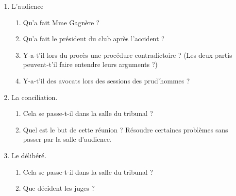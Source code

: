 \documentclass[12pt]{article}
\begin{document}
\begin{enumerate}
\item L'audience
\begin{enumerate}
\item  Qu'a fait Mme Gagnère ? \\

\item Qu'a fait le président du club après l'accident ? \\

\item  Y-a-t'il lors du procès une procédure contradictoire ? (Les deux partis peuvent-t'il faire entendre leurs arguments ?)\\

\item  Y-a-t'il des avocats lors des sessions des prud'hommes ?\\
\end{enumerate}

\item La conciliation. 
\begin{enumerate}
\item Cela se passe-t-il dans la salle du tribunal ? \\

\item Quel est le but de cette réunion ? Résoudre certaines problèmes sans passer par la salle d'audience. \\
 
\end{enumerate}

\item Le délibéré.
\begin{enumerate}
\item Cela se passe-t-il dans la salle du tribunal ? \\
 
\item Que décident les juges ? \\
\end{enumerate}

\end{enumerate}
\end{document}
